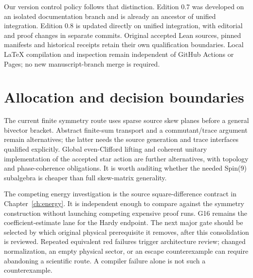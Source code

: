 Our version control policy follows that distinction. Edition 0.7 was
developed on an isolated documentation branch and is already an
ancestor of unified integration. Edition 0.8 is updated directly on
unified integration, with editorial and proof changes in separate
commits. Original accepted Lean sources, pinned manifests and
historical receipts retain their own qualification boundaries. Local
LaTeX compilation and inspection remain independent of GitHub Actions
or Pages; no new manuscript-branch merge is required.

\section{Allocation and decision boundaries}
\label{sec:ed08-decisions}
The current finite symmetry route uses sparse source skew planes
before a general bivector bracket. Abstract finite-sum transport
and a commutant/trace argument remain alternatives; the latter needs
the source generation and trace interfaces qualified explicitly.
Global even-Clifford lifting and coherent unitary implementation of
the accepted star action are further alternatives, with topology
and phase-coherence obligations. It is worth auditing whether the
needed Spin(9) subalgebra is cheaper than full skew-matrix generality.

The competing energy investigation is the source square-difference
contract in Chapter~\ref{ch:energy}. It is independent enough to compare against
the symmetry construction without launching competing expensive
proof runs. G16 remains the coefficient-estimate lane for the Hardy
endpoint. The next major gate should be selected by which original
physical prerequisite it removes, after this consolidation is reviewed.
Repeated equivalent red failures trigger architecture review;
changed normalization, an empty physical sector, or an escape
counterexample can require abandoning a scientific route. A compiler
failure alone is not such a counterexample.
